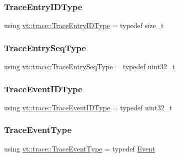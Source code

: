 \subsubsection{\texorpdfstring{Trace\+Entry\+I\+D\+Type}{TraceEntryIDType}}
{\footnotesize\ttfamily using \hyperlink{namespacevt_1_1trace_a3c14050715ba9eceaeff51fb3de64f2f}{vt\+::trace\+::\+Trace\+Entry\+I\+D\+Type} = typedef size\+\_\+t}

\mbox{\label{namespacevt_1_1trace_a522028dd2a7d056f0ec3d417836fdecd}} 
\subsubsection{\texorpdfstring{Trace\+Entry\+Seq\+Type}{TraceEntrySeqType}}
{\footnotesize\ttfamily using \hyperlink{namespacevt_1_1trace_a522028dd2a7d056f0ec3d417836fdecd}{vt\+::trace\+::\+Trace\+Entry\+Seq\+Type} = typedef uint32\+\_\+t}

\mbox{\label{namespacevt_1_1trace_a64a7185f3e102df8d8258f263ccd1582}} 
\subsubsection{\texorpdfstring{Trace\+Event\+I\+D\+Type}{TraceEventIDType}}
{\footnotesize\ttfamily using \hyperlink{namespacevt_1_1trace_a64a7185f3e102df8d8258f263ccd1582}{vt\+::trace\+::\+Trace\+Event\+I\+D\+Type} = typedef uint32\+\_\+t}

\mbox{\label{namespacevt_1_1trace_a79b7fa947245c08d04a3ea67fbff2c30}} 
\subsubsection{\texorpdfstring{Trace\+Event\+Type}{TraceEventType}}
{\footnotesize\ttfamily using \hyperlink{namespacevt_1_1trace_a79b7fa947245c08d04a3ea67fbff2c30}{vt\+::trace\+::\+Trace\+Event\+Type} = typedef \hyperlink{structvt_1_1trace_1_1_event}{Event}}

